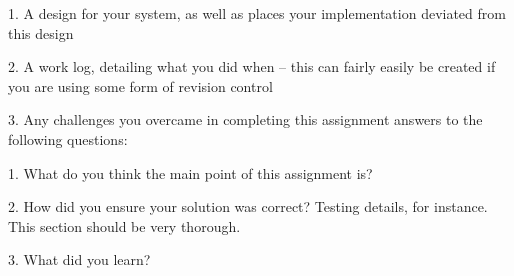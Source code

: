 

1. A design for your system, as well as places your implementation deviated from
this design

2. A work log, detailing what you did when -- this can fairly easily be created if
you are using some form of revision control

3. Any challenges you overcame in completing this assignment
answers to the following questions:

	1. What do you think the main point of this assignment is?

	2. How did you ensure your solution was correct? Testing details, for instance. 
	   This section should be very thorough.

	3. What did you learn?
